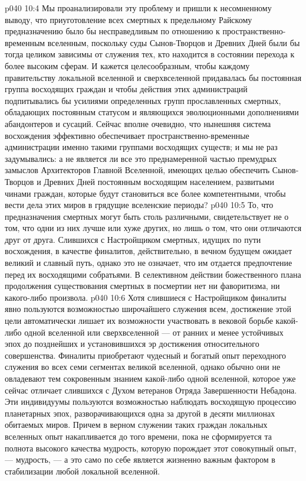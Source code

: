 \vs p040 10:4 Мы проанализировали эту проблему и пришли к несомненному выводу, что приуготовление всех смертных к предельному Райскому предназначению было бы несправедливым по отношению к пространственно\hyp{}временным вселенным, поскольку суды Сынов\hyp{}Творцов и Древних Дней были бы тогда целиком зависимы от служения тех, кто находится в состоянии перехода к более высоким сферам. И кажется целесообразным, чтобы каждому правительству локальной вселенной и сверхвселенной придавалась бы постоянная группа восходящих граждан и чтобы действия этих администраций подпитывались бы усилиями определенных групп прославленных смертных, обладающих постоянным статусом и являющихся эволюционными дополнениями абандонтеров и сусаций. Сейчас вполне очевидно, что нынешняя система восхождения эффективно обеспечивает пространственно\hyp{}временные администрации именно такими группами восходящих существ; и мы не раз задумывались: а не является ли все это преднамеренной частью премудрых замыслов Архитекторов Главной Вселенной, имеющих целью обеспечить Сынов\hyp{}Творцов и Древних Дней постоянным восходящим населением, развитыми чинами граждан, которые будут становиться все более компетентными, чтобы вести дела этих миров в грядущие вселенские периоды?
\vs p040 10:5 \pc То, что предназначения смертных могут быть столь различными, свидетельствует не о том, что одни из них лучше или хуже других, но лишь о том, что они отличаются друг от друга. Слившихся с Настройщиком смертных, идущих по пути восхождения, в качестве финалитов, действительно, в вечном будущем ожидает великий и славный путь, однако это не означает, что им отдается предпочтение перед их восходящими собратьями. В селективном действии божественного плана продолжения существования смертных в посмертии нет ни фаворитизма, ни какого\hyp{}либо произвола.
\vs p040 10:6 \pc Хотя слившиеся с Настройщиком финалиты явно пользуются возможностью широчайшего служения всем, достижение этой цели автоматически лишает их возможности участвовать в вековой борьбе какой\hyp{}либо одной вселенной или сверхвселенной --- от ранних и менее устойчивых эпох до позднейших и установившихся эр достижения относительного совершенства. Финалиты приобретают чудесный и богатый опыт переходного служения во всех семи сегментах великой вселенной, однако обычно они не овладевают тем сокровенным знанием какой\hyp{}либо одной вселенной, которое уже сейчас отличает слившихся с Духом ветеранов Отряда Завершенности Небадона. Эти индивидуумы пользуются возможностью наблюдать восходящую процессию планетарных эпох, разворачивающихся одна за другой в десяти миллионах обитаемых миров. Причем в верном служении таких граждан локальных вселенных опыт накапливается до того времени, пока не сформируется та полнота высокого качества мудрость, которую порождает этот совокупный опыт, ---  мудрость, --- а это само по себе является жизненно важным фактором в стабилизации любой локальной вселенной.
